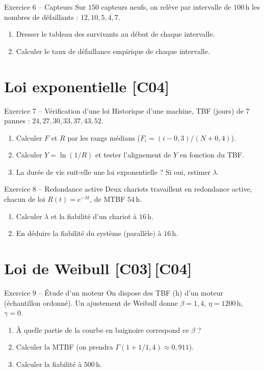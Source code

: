\documentclass[a4paper,11pt]{article}
\begin{document}
\begin{exo}{Exercice 6 -- Capteurs}
Sur $150$ capteurs neufs, on relève par intervalle de $100$\,h les nombres de défaillants : $12, 10, 5, 4, 7$.
\begin{enumerate}[label=\alph*)]
  \item Dresser le tableau des survivants au début de chaque intervalle.
  \item Calculer le taux de défaillance empirique de chaque intervalle.
\end{enumerate}
\end{exo}

\section{Loi exponentielle \hfill {\normalsize\color{uimmred}[C04]}}

\begin{exo}{Exercice 7 -- Vérification d'une loi}
Historique d'une machine, TBF (jours) de $7$ pannes : $24, 27, 30, 33, 37, 43, 52$.
\begin{enumerate}[label=\alph*)]
  \item Calculer $F$ et $R$ par les rangs médians ($F_i = (i-0{,}3)/(N+0{,}4)$).
  \item Calculer $Y = \ln(1/R)$ et tester l'alignement de $Y$ en fonction du TBF.
  \item La durée de vie suit-elle une loi exponentielle ? Si oui, estimer $\lambda$.
\end{enumerate}
\end{exo}

\begin{exo}{Exercice 8 -- Redondance active}
Deux chariots travaillent en redondance active, chacun de loi $R(t) = e^{-\lambda t}$, de MTBF $54$\,h.
\begin{enumerate}[label=\alph*)]
  \item Calculer $\lambda$ et la fiabilité d'un chariot à $16$\,h.
  \item En déduire la fiabilité du système (parallèle) à $16$\,h.
\end{enumerate}
\end{exo}

\section{Loi de Weibull \hfill {\normalsize\color{uimmred}[C03]\,[C04]}}

\begin{exo}{Exercice 9 -- Étude d'un moteur}
On dispose des TBF (h) d'un moteur (échantillon ordonné). Un ajustement de Weibull donne $\beta = 1{,}4$, $\eta = 1200$\,h, $\gamma = 0$.
\begin{enumerate}[label=\alph*)]
  \item À quelle partie de la courbe en baignoire correspond ce $\beta$ ?
  \item Calculer la MTBF (on prendra $\Gamma(1 + 1/1{,}4) \approx 0{,}911$).
  \item Calculer la fiabilité à $500$\,h.
\end{enumerate}
\end{exo}
\end{document}
